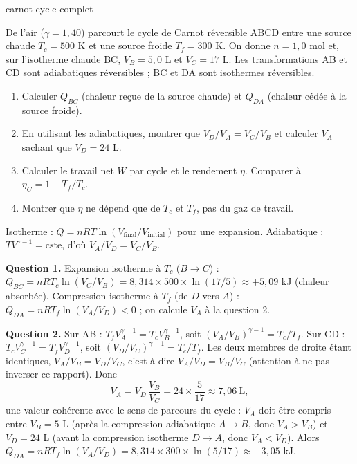 \begin{exo}{carnot-cycle-complet}

De l'air ($\gamma = 1{,}40$) parcourt le cycle de Carnot réversible ABCD entre une source chaude $T_c = 500$ K et une source froide $T_f = 300$ K. On donne $n = 1{,}0$ mol et, sur l'isotherme chaude BC, $V_B = 5{,}0$ L et $V_C = 17$ L. Les transformations AB et CD sont adiabatiques réversibles ; BC et DA sont isothermes réversibles.

\begin{enumerate}
\item Calculer $Q_{BC}$ (chaleur reçue de la source chaude) et $Q_{DA}$ (chaleur cédée à la source froide).
\item En utilisant les adiabatiques, montrer que $V_D/V_A = V_C/V_B$ et calculer $V_A$ sachant que $V_D = 24$ L.
\item Calculer le travail net $W$ par cycle et le rendement $\eta$. Comparer à $\eta_C = 1 - T_f/T_c$.
\item Montrer que $\eta$ ne dépend que de $T_c$ et $T_f$, pas du gaz de travail.
\end{enumerate}

\begin{indication}
Isotherme : $Q = nRT\ln(V_{\text{final}}/V_{\text{initial}})$ pour une expansion. Adiabatique : $TV^{\gamma-1} = \text{cste}$, d'où $V_A/V_D = V_C/V_B$.
\end{indication}

\begin{solution}
\textbf{Question 1.} Expansion isotherme à $T_c$ ($B \to C$) : $Q_{BC} = nRT_c\ln(V_C/V_B) = 8{,}314\times500\times\ln(17/5) \approx +5{,}09$ kJ (chaleur absorbée). Compression isotherme à $T_f$ (de $D$ vers $A$) : $Q_{DA} = nRT_f\ln(V_A/V_D) < 0$ ; on calcule $V_A$ à la question 2.

\textbf{Question 2.} Sur AB : $T_f V_A^{\gamma-1} = T_c V_B^{\gamma-1}$, soit $(V_A/V_B)^{\gamma-1} = T_c/T_f$. Sur CD : $T_c V_C^{\gamma-1} = T_f V_D^{\gamma-1}$, soit $(V_D/V_C)^{\gamma-1} = T_c/T_f$. Les deux membres de droite étant identiques, $V_A/V_B = V_D/V_C$, c'est-à-dire $V_A/V_D = V_B/V_C$ (attention à ne pas inverser ce rapport). Donc
\[
V_A = V_D\,\frac{V_B}{V_C} = 24\times\frac{5}{17} \approx 7{,}06\ \text{L},
\]
une valeur cohérente avec le sens de parcours du cycle : $V_A$ doit être compris entre $V_B = 5$ L (après la compression adiabatique $A\to B$, donc $V_A > V_B$) et $V_D = 24$ L (avant la compression isotherme $D\to A$, donc $V_A < V_D$). Alors $Q_{DA} = nRT_f\ln(V_A/V_D) = 8{,}314\times300\times\ln(5/17) \approx -3{,}05$ kJ.


\end{solution}
\end{exo}
